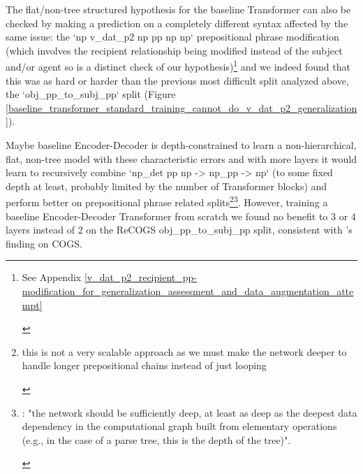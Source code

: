 \documentclass[11pt]{article}
\begin{document}
The flat/non-tree structured hypothesis for the baseline Transformer can also be checked by making a prediction on a completely different syntax affected by the same issue: the `np v\_dat\_p2 np pp np np` prepositional phrase modification (which involves the recipient relationship being modified instead of the subject and/or agent so is a distinct check of our hypothesis)\footnote{\begin{footnotesize}See Appendix \ref{v_dat_p2_recipient_pp-modification_for_generalization_assessment_and_data_augmentation_attempt}\end{footnotesize}} and we indeed found that this was as hard or harder than the previous most difficult split analyzed above, the `obj\_pp\_to\_subj\_pp` split (Figure \ref{baseline_transformer_standard_training_cannot_do_v_dat_p2_generalization}).

Maybe \cite{Wu2023} baseline Encoder-Decoder is depth-constrained to learn a non-hierarchical, flat, non-tree model with these characteristic errors and with more layers it would learn to recursively combine `np\_det pp np -> np\_pp -> np` (to some fixed depth at least, probably limited by the number of Transformer blocks) and perform better on prepositional phrase related splits\footnote{\begin{footnotesize}this is not a very scalable approach as we must make the network deeper to handle longer prepositional chains instead of just looping
\end{footnotesize}
}\footnote{\begin{footnotesize}\cite{Csordas2022}: "the network should be sufficiently deep, at least as deep as the deepest data dependency in the computational graph built from elementary operations (e.g., in the case of a parse tree, this is the depth of the tree)".\end{footnotesize}}. However, training a \cite{Wu2023} baseline Encoder-Decoder Transformer from scratch we found no benefit to 3 or 4 layers instead of 2 on the ReCOGS obj\_pp\_to\_subj\_pp split, consistent with \cite{petty2024impactdepthcompositionalgeneralization}'s finding on COGS.
\end{document}
